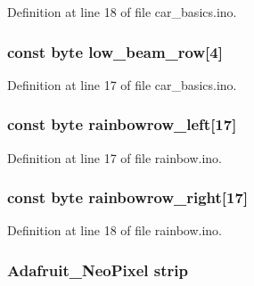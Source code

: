 Definition at line 18 of file car\+\_\+basics.\+ino.

\subsubsection[{\texorpdfstring{low\+\_\+beam\+\_\+row}{low_beam_row}}]{\setlength{\rightskip}{0pt plus 5cm}const byte low\+\_\+beam\+\_\+row\mbox{[}4\mbox{]}}\hypertarget{group__deployment_ga89eb753b2bc73cbce90666cfe4331634}{}\label{group__deployment_ga89eb753b2bc73cbce90666cfe4331634}


Definition at line 17 of file car\+\_\+basics.\+ino.

\subsubsection[{\texorpdfstring{rainbowrow\+\_\+left}{rainbowrow_left}}]{\setlength{\rightskip}{0pt plus 5cm}const byte rainbowrow\+\_\+left\mbox{[}17\mbox{]}}\hypertarget{group__deployment_ga61c28c043183f54a51db2a5175940b86}{}\label{group__deployment_ga61c28c043183f54a51db2a5175940b86}


Definition at line 17 of file rainbow.\+ino.

\subsubsection[{\texorpdfstring{rainbowrow\+\_\+right}{rainbowrow_right}}]{\setlength{\rightskip}{0pt plus 5cm}const byte rainbowrow\+\_\+right\mbox{[}17\mbox{]}}\hypertarget{group__deployment_gaa16b875157c2f58794ae5136b851c078}{}\label{group__deployment_gaa16b875157c2f58794ae5136b851c078}


Definition at line 18 of file rainbow.\+ino.

\subsubsection[{\texorpdfstring{strip}{strip}}]{\setlength{\rightskip}{0pt plus 5cm}Adafruit\+\_\+\+Neo\+Pixel strip}\hypertarget{group__deployment_gacf2771bd8bfaf855bbcc6c30301bf380}{}\label{group__deployment_gacf2771bd8bfaf855bbcc6c30301bf380}


